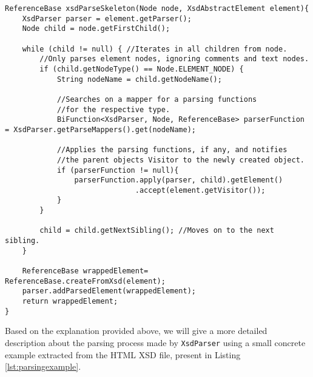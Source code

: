 
\begin{minipage}{\linewidth}
\begin{lstlisting}[caption={XsdParseSkeleton Parsing Children From a Node},captionpos=b,label={lst:skeletonfunction}]
ReferenceBase xsdParseSkeleton(Node node, XsdAbstractElement element){
    XsdParser parser = element.getParser();
    Node child = node.getFirstChild();

    while (child != null) { //Iterates in all children from node.
        //Only parses element nodes, ignoring comments and text nodes.
        if (child.getNodeType() == Node.ELEMENT_NODE) { 
            String nodeName = child.getNodeName();

            //Searches on a mapper for a parsing functions 
            //for the respective type.
            BiFunction<XsdParser, Node, ReferenceBase> parserFunction = XsdParser.getParseMappers().get(nodeName);

            //Applies the parsing functions, if any, and notifies 
            //the parent objects Visitor to the newly created object.
            if (parserFunction != null){
                parserFunction.apply(parser, child).getElement()
                              .accept(element.getVisitor());
            }
        }

        child = child.getNextSibling(); //Moves on to the next sibling.
    }

    ReferenceBase wrappedElement= ReferenceBase.createFromXsd(element);
    parser.addParsedElement(wrappedElement);
    return wrappedElement;
}
\end{lstlisting}
\end{minipage}

\noindent
Based on the explanation provided above, we will give a more detailed description about the parsing process made by \texttt{XsdParser} using a small concrete example extracted from the \ac{HTML} \ac{XSD} file, present in Listing \ref{lst:parsingexample}.

\bigskip


